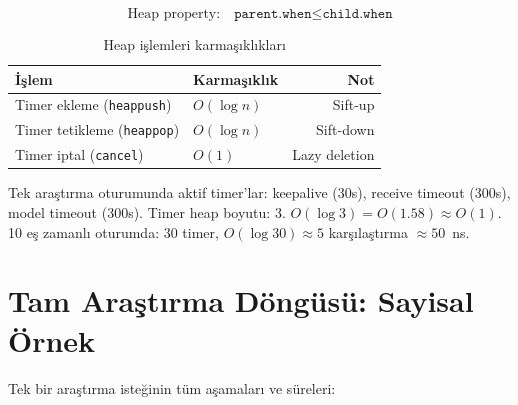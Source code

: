 \begin{equation}
\label{eq:heap-property}
\text{Heap property:} \quad \texttt{parent.when} \leq \texttt{child.when}
\end{equation}

\begin{table}[H]
\centering
\caption{Heap i\c{s}lemleri karma\c{s}{\i}kl{\i}klar{\i}}
\label{tab:heap-ops}
\begin{tabularx}{0.8\textwidth}{Xlr}
\toprule
\color{chapterBlue}\textbf{\.{I}\c{s}lem} & \color{chapterBlue}\textbf{Karma\c{s}{\i}kl{\i}k} & \color{chapterBlue}\textbf{Not} \\
\midrule
Timer ekleme (\texttt{heappush}) & $O(\log n)$ & Sift-up \\
Timer tetikleme (\texttt{heappop}) & $O(\log n)$ & Sift-down \\
Timer iptal (\texttt{cancel}) & $O(1)$ & Lazy deletion \\
\bottomrule
\end{tabularx}
\end{table}

\begin{ornek}
Tek ara\c{s}t{\i}rma oturumunda aktif timer'lar: keepalive (30s), receive timeout (300s), model timeout (300s). Timer heap boyutu: 3.
$O(\log 3) = O(1.58) \approx O(1)$. 10 e\c{s} zamanl{\i} oturumda: 30 timer, $O(\log 30) \approx 5$ kar\c{s}{\i}la\c{s}t{\i}rma $\approx 50$~ns.
\end{ornek}


\section{Tam Ara\c{s}t{\i}rma D\"{o}ng\"{u}s\"{u}: Sayisal \"{O}rnek}
\label{sec:full-cycle}

Tek bir ara\c{s}t{\i}rma iste\u{g}inin t\"{u}m a\c{s}amalar{\i} ve s\"{u}releri:

